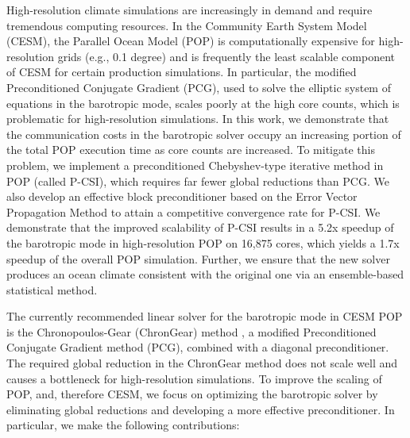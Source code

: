 \begin{eabstract}
  High-resolution climate simulations are increasingly in demand and
  require tremendous computing resources. In the Community
  Earth System Model (CESM), the Parallel Ocean Model (POP) is
  computationally expensive for high-resolution grids (e.g.,
  0.1 degree) and is frequently the least scalable component of CESM for certain
  production simulations. In particular, the modified Preconditioned
  Conjugate Gradient (PCG), used to solve the elliptic system of
  equations in the barotropic mode, scales poorly at the high core
  counts, which is problematic for high-resolution simulations. In
  this work, we demonstrate that the communication costs in the
  barotropic solver occupy an increasing portion of the total POP
  execution time as core counts are increased. To mitigate this
  problem, we implement a preconditioned Chebyshev-type iterative
  method in POP (called P-CSI), which requires far fewer global
  reductions than PCG.  We also develop an effective block
  preconditioner based on the Error Vector Propagation Method to
  attain a competitive convergence rate for P-CSI.  We demonstrate
  that the improved scalability of P-CSI results in a 5.2x speedup of
  the barotropic mode in high-resolution POP on 16,875 cores, which
  yields a 1.7x speedup of the overall POP simulation.  Further,
  we ensure that the new solver produces an ocean climate consistent with the original
  one via an ensemble-based statistical method.

  The currently recommended linear solver for the barotropic mode in CESM
POP is the Chronopoulos-Gear (ChronGear) method
\cite{dAzevedo1999lapack}, a modified Preconditioned Conjugate
Gradient method (PCG), combined with a diagonal preconditioner.
The required global reduction in the ChronGear method does not scale well and
causes a bottleneck for high-resolution simulations.  To improve the scaling
of POP, and, therefore CESM, we focus on optimizing the barotropic
solver by eliminating global reductions and developing a more
effective preconditioner.  In particular, we make the following
contributions:


 

\begin{itemize}


\end{itemize}
\end{eabstract}
